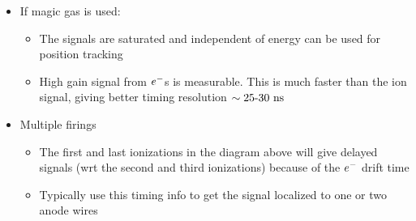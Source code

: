 \begin{itemize}
\begin{itemize}
  \end{itemize}
  \item If magic gas is used:
  \begin{itemize}
    \item The signals are saturated and independent of energy \thus can be used for position tracking
    \item High gain \thus signal from $e^{-}$s is measurable. This is much faster than the ion signal, giving better timing resolution $\sim25\text{-}30~\text{ns}$
  \end{itemize}
  \item Multiple firings 
  \begin{itemize}
    \item The first and last ionizations in the diagram above will give delayed signals (wrt the second and third ionizations) because of the $e^{-}$ drift time
    \item Typically use this timing info to get the signal localized to one or two anode wires
  \end{itemize}
\end{itemize}

